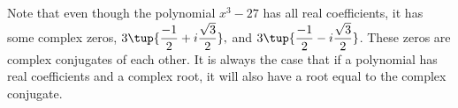 Note that even though the polynomial $x^{3}-27$ has all real coefficients,
it has some complex zeros, $3\tup{\displaystyle
\frac{-1}{2}+i\displaystyle\frac{\sqrt{3}}{2}} ,$ and $3\tup{
\displaystyle\frac{-1}{2}-i\displaystyle\frac{\sqrt{3}}{2}} $. 
These zeros are complex conjugates of each other. It is always the case that if a polynomial has real 
coefficients and a complex root, it will also
have a root equal to the complex conjugate.